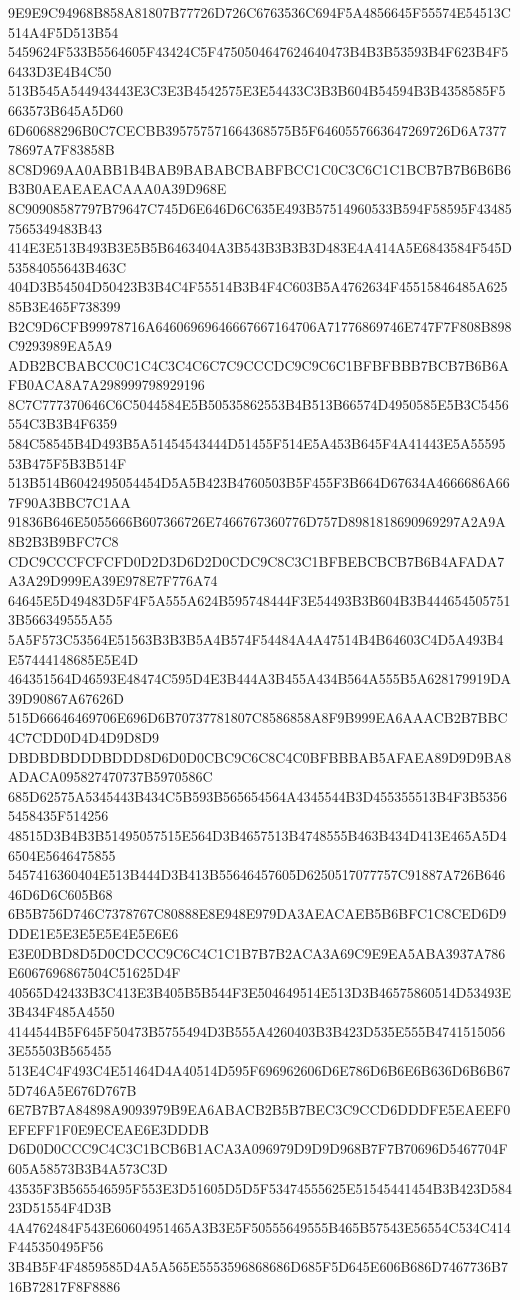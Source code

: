 {{{{{{{{{{{{{{{{{{{{{9E9E9C94968B858A81807B77726D726C6763536C694F5A4856645F55574E54513C514A4F5D513B54
5459624F533B5564605F43424C5F4750504647624640473B4B3B53593B4F623B4F56433D3E4B4C50
513B545A544943443E3C3E3B4542575E3E54433C3B3B604B54594B3B4358585F5663573B645A5D60
6D60688296B0C7CECBB395757571664368575B5F6460557663647269726D6A737778697A7F83858B
8C8D969AA0ABB1B4BAB9BABABCBABFBCC1C0C3C6C1C1BCB7B7B6B6B6B3B0AEAEAEACAAA0A39D968E
8C90908587797B79647C745D6E646D6C635E493B57514960533B594F58595F434857565349483B43
414E3E513B493B3E5B5B6463404A3B543B3B3B3D483E4A414A5E6843584F545D53584055643B463C
404D3B54504D50423B3B4C4F55514B3B4F4C603B5A4762634F45515846485A62585B3E465F738399
B2C9D6CFB99978716A64606969646667667164706A71776869746E747F7F808B898C9293989EA5A9
ADB2BCBABCC0C1C4C3C4C6C7C9CCCDC9C9C6C1BFBFBBB7BCB7B6B6AFB0ACA8A7A298999798929196
8C7C777370646C6C5044584E5B50535862553B4B513B66574D4950585E5B3C5456554C3B3B4F6359
584C58545B4D493B5A51454543444D51455F514E5A453B645F4A41443E5A5559553B475F5B3B514F
513B514B6042495054454D5A5B423B4760503B5F455F3B664D67634A4666686A667F90A3BBC7C1AA
91836B646E5055666B607366726E7466767360776D757D8981818690969297A2A9A8B2B3B9BFC7C8
CDC9CCCFCFCFD0D2D3D6D2D0CDC9C8C3C1BFBEBCBCB7B6B4AFADA7A3A29D999EA39E978E7F776A74
64645E5D49483D5F4F5A555A624B595748444F3E54493B3B604B3B4446545057513B566349555A55
5A5F573C53564E51563B3B3B5A4B574F54484A4A47514B4B64603C4D5A493B4E57444148685E5E4D
464351564D46593E48474C595D4E3B444A3B455A434B564A555B5A628179919DA39D90867A67626D
515D66646469706E696D6B70737781807C8586858A8F9B999EA6AAACB2B7BBC4C7CDD0D4D4D9D8D9
DBDBDBDDDBDDD8D6D0D0CBC9C6C8C4C0BFBBBAB5AFAEA89D9D9BA8ADACA095827470737B5970586C
685D62575A5345443B434C5B593B565654564A4345544B3D455355513B4F3B53565458435F514256
48515D3B4B3B51495057515E564D3B4657513B4748555B463B434D413E465A5D46504E5646475855
5457416360404E513B444D3B413B55646457605D6250517077757C91887A726B64646D6D6C605B68
6B5B756D746C7378767C80888E8E948E979DA3AEACAEB5B6BFC1C8CED6D9DDE1E5E3E5E5E4E5E6E6
E3E0DBD8D5D0CDCCC9C6C4C1C1B7B7B2ACA3A69C9E9EA5ABA3937A786E6067696867504C51625D4F
40565D42433B3C413E3B405B5B544F3E504649514E513D3B46575860514D53493E3B434F485A4550
4144544B5F645F50473B5755494D3B555A4260403B3B423D535E555B47415150563E55503B565455
513E4C4F493C4E51464D4A40514D595F696962606D6E786D6B6E6B636D6B6B675D746A5E676D767B
6E7B7B7A84898A9093979B9EA6ABACB2B5B7BEC3C9CCD6DDDFE5EAEEF0EFEFF1F0E9ECEAE6E3DDDB
D6D0D0CCC9C4C3C1BCB6B1ACA3A096979D9D9D968B7F7B70696D5467704F605A58573B3B4A573C3D
43535F3B565546595F553E3D51605D5D5F53474555625E51545441454B3B423D58423D51554F4D3B
4A4762484F543E60604951465A3B3E5F50555649555B465B57543E56554C534C414F445350495F56
3B4B5F4F4859585D4A5A565E5553596868686D685F5D645E606B686D7467736B716B72817F8F8886
}}}}}}}}}}}}}}}}}}}}}
